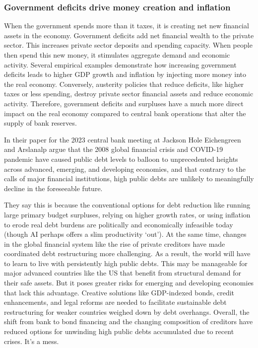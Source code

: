 \subsubsection{Government deficits drive money creation and inflation}
When the government spends more than it taxes, it is creating net new financial assets in the economy. Government deficits add net financial wealth to the private sector.
This increases private sector deposits and spending capacity. When people then spend this new money, it stimulates aggregate demand and economic activity.
Several empirical examples demonstrate how increasing government deficits leads to higher GDP growth and inflation by injecting more money into the real economy.
Conversely, austerity policies that reduce deficits, like higher taxes or less spending, destroy private sector financial assets and reduce economic activity.
Therefore, government deficits and surpluses have a much more direct impact on the real economy compared to central bank operations that alter the supply of bank reserves.\par
In their paper for the 2023 central bank meeting at Jackson Hole Eichengreen and Arslanalp \cite{Eichengreen2023} argue that the 2008 global financial crisis and COVID-19 pandemic have caused public debt levels to balloon to unprecedented heights across advanced, emerging, and developing economies, and that contrary to the calls of major financial institutions, high public debts are unlikely to meaningfully decline in the foreseeable future.\par 
They say this is because the conventional options for debt reduction like running large primary budget surpluses, relying on higher growth rates, or using inflation to erode real debt burdens are politically and economically infeasible today (though AI perhaps offers a slim productivity `out'). At the same time, changes in the global financial system like the rise of private creditors have made coordinated debt restructuring more challenging. As a result, the world will have to learn to live with persistently high public debts. This may be manageable for major advanced countries like the US that benefit from structural demand for their safe assets. But it poses greater risks for emerging and developing economies that lack this advantage. Creative solutions like GDP-indexed bonds, credit enhancements, and legal reforms are needed to facilitate sustainable debt restructuring for weaker countries weighed down by debt overhangs. Overall, the shift from bank to bond financing and the changing composition of creditors have reduced options for unwinding high public debts accumulated due to recent crises. It's a mess.
